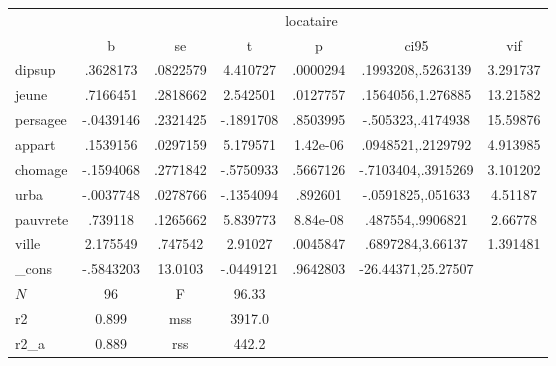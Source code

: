 \begin{tabular}{l*{1}{cccccc}}
\toprule
            &\multicolumn{6}{c}{locataire}                                                \\
            &           b&          se&           t&           p&        ci95&         vif\\
\midrule
dipsup      &    .3628173&    .0822579&    4.410727&    .0000294&.1993208,.5263139&    3.291737\\
jeune       &    .7166451&    .2818662&    2.542501&    .0127757&.1564056,1.276885&    13.21582\\
persagee    &   -.0439146&    .2321425&   -.1891708&    .8503995&-.505323,.4174938&    15.59876\\
appart      &    .1539156&    .0297159&    5.179571&    1.42e-06&.0948521,.2129792&    4.913985\\
chomage     &   -.1594068&    .2771842&   -.5750933&    .5667126&-.7103404,.3915269&    3.101202\\
urba        &   -.0037748&    .0278766&   -.1354094&     .892601&-.0591825,.051633&     4.51187\\
pauvrete    &     .739118&    .1265662&    5.839773&    8.84e-08&.487554,.9906821&     2.66778\\
ville       &    2.175549&     .747542&     2.91027&    .0045847&.6897284,3.66137&    1.391481\\
\_cons      &   -.5843203&     13.0103&   -.0449121&    .9642803&-26.44371,25.27507&            \\
\midrule
\(N\)       &          96& F           &   96.33         &            &            &            \\
r2          &       0.899& mss           &  3917.0          &            &            &            \\
r2\_a        &      0.889& rss           & 442.2           &            &            &            \\
\bottomrule
\end{tabular}

